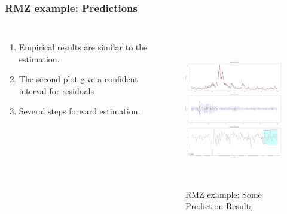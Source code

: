 \documentclass{beamer}
\newcommand\Fontviii{\fontsize{8}{9.2}\selectfont}
\begin{document}
\begin{frame}
\frametitle{RMZ example: Predictions}
\Fontviii
\begin{columns}[c]
\begin{enumerate}
\item Empirical results are similar to the estimation.
\item The second plot give a confident interval for residuals
\item Several steps forward estimation.
\end{enumerate}
 
 
\begin{figure}[h]
\centering 
\includegraphics[width=6cm,height = 6cm]{../figures/RMZeg_pred}
\label{fig: dailyReturns}
\caption{RMZ example: Some Prediction Results}
\end{figure}

\end{columns}
\end{frame}
\end{document}
